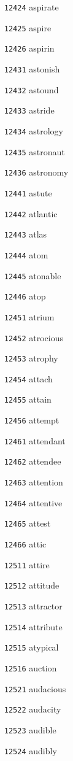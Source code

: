 \documentclass[twoside,11pt]{article}
\begin{document}
\begin{multicols}{5}
\begin{enumerate}
\item[\texttt{12424}] aspirate
\item[\texttt{12425}] aspire
\item[\texttt{12426}] aspirin
\item[\texttt{12431}] astonish
\item[\texttt{12432}] astound
\item[\texttt{12433}] astride
\item[\texttt{12434}] astrology
\item[\texttt{12435}] astronaut
\item[\texttt{12436}] astronomy
\item[\texttt{12441}] astute
\item[\texttt{12442}] atlantic
\item[\texttt{12443}] atlas
\item[\texttt{12444}] atom
\item[\texttt{12445}] atonable
\item[\texttt{12446}] atop
\item[\texttt{12451}] atrium
\item[\texttt{12452}] atrocious
\item[\texttt{12453}] atrophy
\item[\texttt{12454}] attach
\item[\texttt{12455}] attain
\item[\texttt{12456}] attempt
\item[\texttt{12461}] attendant
\item[\texttt{12462}] attendee
\item[\texttt{12463}] attention
\item[\texttt{12464}] attentive
\item[\texttt{12465}] attest
\item[\texttt{12466}] attic
\item[\texttt{12511}] attire
\item[\texttt{12512}] attitude
\item[\texttt{12513}] attractor
\item[\texttt{12514}] attribute
\item[\texttt{12515}] atypical
\item[\texttt{12516}] auction
\item[\texttt{12521}] audacious
\item[\texttt{12522}] audacity
\item[\texttt{12523}] audible
\item[\texttt{12524}] audibly

\end{enumerate}
\end{multicols}
\end{document}
